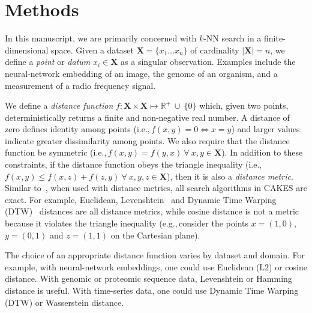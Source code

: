 \section{Methods}
\label{sec:methods}

In this manuscript, we are primarily concerned with $k$-NN search in a finite-dimensional space.
Given a dataset $\textbf{X} = \{x_1 \dots x_n\}$ of cardinality $|\textbf{X}| = n$, we define a \textit{point} or \textit{datum} $x_i \in \textbf{X}$ as a singular observation. Examples include the neural-network embedding of an image, the genome of an organism, and a measurement of a radio frequency signal.

We define a \textit{distance function} $f : \textbf{X} \times \textbf{X} \mapsto \mathbb{R}^+ \ \cup \ \{0\}$ which, given two points, deterministically returns a finite and non-negative real number.
A distance of zero defines identity among points (i.e.,\,$f(x, y) = 0 \Leftrightarrow x = y$) and larger values indicate greater dissimilarity among points.
We also require that the distance function be symmetric (i.e.,\,$f(x, y) = f(y, x) \ \forall \ x, y \in \textbf{X}$).
In addition to these constraints, if the distance function obeys the triangle inequality (i.e.,\,$f(x, y) \leq f(x, z) + f(z, y) \ \forall \ x, y, z \in \textbf{X}$), then it is also a \textit{distance metric}.
Similar to~\cite{yu2015entropy}, when used with distance metrics, all search algorithms in CAKES are exact.
For example, Euclidean, Levenshtein~\cite{levenshtein1966binary} and Dynamic Time Warping (DTW)~\cite{muller2007dynamic} distances are all distance metrics, while cosine distance is not a metric because it violates the triangle inequality (e.g.,\,consider the points $x = (1, 0)$, $y = (0, 1)$ and $z = (1, 1)$ on the Cartesian plane).

The choice of an appropriate distance function varies by dataset and domain.
For example, with neural-network embeddings, one could use Euclidean (L2) or cosine distance.
With genomic or proteomic sequence data, Levenshtein or Hamming distance is useful.
With time-series data, one could use Dynamic Time Warping (DTW) or Wasserstein distance.

